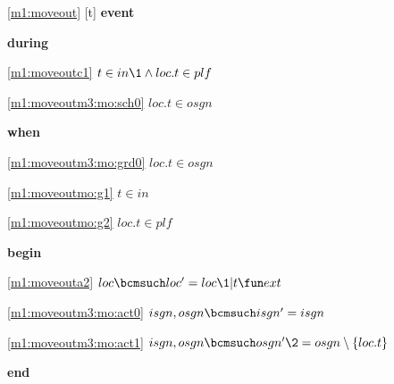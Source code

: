 \noindent \ref{m1:moveout} [t] \textbf{event}
\begin{block}
  \item   \textbf{during}
  \begin{block}
  \item[ \eqref{m1:moveoutc1} ]$t \in in  %
  		\1\land loc.t \in plf $ %
  \item[ \eqref{m1:moveoutm3:mo:sch0} ]$loc.t \in osgn $ %
  \end{block}
  \item   \textbf{when}
  \begin{block}
  \item[ \eqref{m1:moveoutm3:mo:grd0} ]$loc.t \in osgn $ %
  \item[ \eqref{m1:moveoutmo:g1} ]$t \in in $ %
  \item[ \eqref{m1:moveoutmo:g2} ]$loc.t \in plf $ %
  \end{block}
  \item   \textbf{begin}
  \begin{block}
  \item[ \eqref{m1:moveouta2} ] \sout{$loc \bcmsuch loc' = loc \1 | t \fun ext $} %
  \item[ \eqref{m1:moveoutm3:mo:act0} ]$isgn,osgn \bcmsuch isgn' = isgn$ %
  \item[ \eqref{m1:moveoutm3:mo:act1} ]$isgn,osgn \bcmsuch osgn'  \2 = osgn  %
  	\setminus \{ loc.t \} $ %
  \end{block}
  \item   \textbf{end} \\
\end{block}
